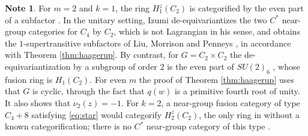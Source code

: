 \documentclass[10pt]{article}
\theoremstyle{plain}
\theoremstyle{definition}
\newtheorem{note}[theorem]{Note}
\theoremstyle{plain}
\begin{document}
\begin{note}\label{rem:evenm}
For $m=2$ and $k=1$, the ring $H_1^z(C_2)$ is categorified by the even part of a subfactor \cite[Remark 1.2]{MR3229513}. In the unitary setting, Izumi de-equivariantizes the two $C^\ast$ near-group categories for $C_4$ by $C_2$, which is not Lagrangian in his sense, and obtains the $1$-supertransitive subfactors of Liu, Morrison and Penneys \cite[Example 12.12]{MR3635673}, in accordance with Theorem \ref{thm:haagerup}. By contrast, for $G=C_2\times C_2$ the de-equivariantization by a subgroup of order $2$ is the even part of $SU(2)_6$ \cite[Example 12.11]{MR3635673}, whose fusion ring is $H_1(C_2)$. For even $m$ the proof of Theorem \ref{thm:haagerup} uses that $G$ is cyclic, through the fact that $q(w)$ is a primitive fourth root of unity. It also shows that $\nu_2(z)=-1$. For $k=2$, a near-group fusion category of type $C_4+8$ satisfying \eqref{eq:star} would categorify $H_2^z(C_2)$, the only ring in \cite[Theorem 1.1]{MR3229513} without a known categorification; there is no $C^\ast$ near-group category of this type \cite[Theorem 10.22]{MR3635673}.
\end{note}
\end{document}
